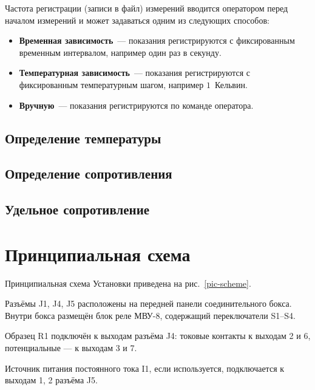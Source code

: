 \documentclass[12pt, a4paper, twocolumn]{report}
\begin{document}
\label{sec_registration_types}

Частота регистрации (записи в файл) измерений вводится оператором перед началом измерений и может задаваться одним из следующих способов:

\begin{itemize}
\item {\bf Временная зависимость}~--- показания регистрируются с фиксированным временным интервалом, например один раз в секунду.
\item {\bf Температурная зависимость}~--- показания регистрируются с фиксированным температурным шагом, например $1$~Кельвин.
\item \label{sec_reg_type_manual} {\bf Вручную}~--- показания регистрируются по команде оператора.
\end{itemize}

\subsection{Определение температуры}



\subsection{Определение сопротивления}



\subsection{Удельное сопротивление}



\section{Принципиальная схема}
\label{sec_schematic_diagram}

Принципиальная схема Установки приведена на рис.~\ref{pic-scheme}.

Разъёмы J1, J4, J5 расположены на передней панели соединительного бокса. Внутри бокса размещён блок реле МВУ-8, содержащий переключатели S1--S4.

Образец R1 подключён к выходам разъёма J4: токовые контакты к выходам 2 и 6, потенциальные --- к выходам 3 и 7.

Источник питания постоянного тока I1, если используется, подключается к выходам 1, 2 разъёма J5.
\end{document}
